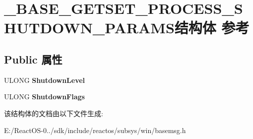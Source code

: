 \hypertarget{struct___b_a_s_e___g_e_t_s_e_t___p_r_o_c_e_s_s___s_h_u_t_d_o_w_n___p_a_r_a_m_s}{}\section{\+\_\+\+B\+A\+S\+E\+\_\+\+G\+E\+T\+S\+E\+T\+\_\+\+P\+R\+O\+C\+E\+S\+S\+\_\+\+S\+H\+U\+T\+D\+O\+W\+N\+\_\+\+P\+A\+R\+A\+M\+S结构体 参考}
\label{struct___b_a_s_e___g_e_t_s_e_t___p_r_o_c_e_s_s___s_h_u_t_d_o_w_n___p_a_r_a_m_s}
\subsection*{Public 属性}
\begin{DoxyCompactItemize}
\item 
\mbox{\label{struct___b_a_s_e___g_e_t_s_e_t___p_r_o_c_e_s_s___s_h_u_t_d_o_w_n___p_a_r_a_m_s_acdd161074f928eb761aa92cb00a4c67f}} 
U\+L\+O\+NG {\bfseries Shutdown\+Level}
\item 
\mbox{\label{struct___b_a_s_e___g_e_t_s_e_t___p_r_o_c_e_s_s___s_h_u_t_d_o_w_n___p_a_r_a_m_s_a2b70016d2ba487b7206f88bbbf74b78a}} 
U\+L\+O\+NG {\bfseries Shutdown\+Flags}
\end{DoxyCompactItemize}


该结构体的文档由以下文件生成\+:\begin{DoxyCompactItemize}
\item 
E\+:/\+React\+O\+S-\/0../sdk/include/reactos/subsys/win/basemsg.\+h\end{DoxyCompactItemize}
